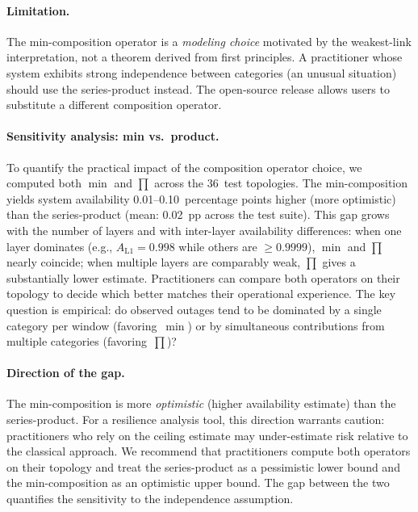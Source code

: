 \documentclass[10pt,twocolumn]{article}
\begin{document}
\paragraph{Limitation.}
The min-composition operator is a \emph{modeling choice} motivated
by the weakest-link interpretation, not a theorem derived from
first principles. A practitioner whose system exhibits strong
independence between categories (an unusual situation) should use
the series-product instead. The open-source release allows users
to substitute a different composition operator.

\paragraph{Sensitivity analysis: min vs.\ product.}
To quantify the practical impact of the composition operator
choice, we computed both $\min$ and $\prod$ across the 36~test
topologies. The min-composition yields system availability
0.01--0.10~percentage points higher (more optimistic) than the
series-product (mean: 0.02~pp across the test suite). This gap
grows with the number of layers and with inter-layer availability
differences: when one layer dominates (e.g., $A_{\text{L1}} = 0.998$
while others are $\ge 0.9999$), $\min$ and $\prod$ nearly coincide;
when multiple layers are comparably weak, $\prod$ gives a
substantially lower estimate. Practitioners can compare both operators on their
topology to decide which better matches their operational
experience. The key question is empirical: do observed outages
tend to be dominated by a single category per window
(favoring~$\min$) or by simultaneous contributions from multiple
categories (favoring~$\prod$)?

\paragraph{Direction of the gap.}
The min-composition is more \emph{optimistic} (higher availability estimate)
than the series-product. For a resilience analysis tool, this direction
warrants caution: practitioners who rely on the ceiling estimate may
under-estimate risk relative to the classical approach. We recommend
that practitioners compute both operators on their topology and treat
the series-product as a pessimistic lower bound and the min-composition
as an optimistic upper bound. The gap between the two quantifies the
sensitivity to the independence assumption.
\end{document}
